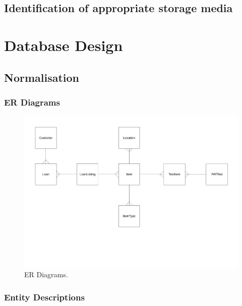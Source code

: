 \subsection{Identification of appropriate storage media}

\section{Database Design}

\subsection{Normalisation}

\newpage

\begin{landscape}

\subsubsection{ER Diagrams}

\begin{figure}[H]
    \centerline{\includegraphics[width=600px]{./Design/Database_Design/Normalisation/ER_Diagrams/ER_Diagram.pdf}}
    \caption{ER Diagrams.} \label{fig:ER Diagrams}
\end{figure}

\end{landscape}

\subsubsection{Entity Descriptions}

